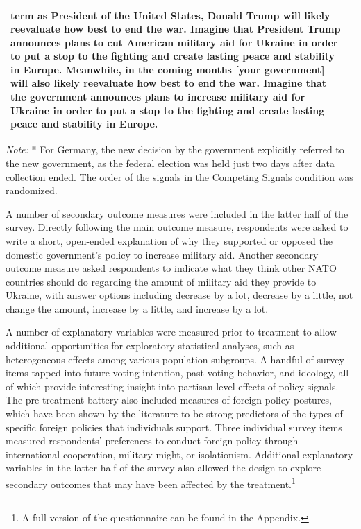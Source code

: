\begin{table}[H]
\begin{threeparttable}
\begin{tabular}{p{2.5cm}p{11.5cm}}
  term as President of the United States, Donald Trump will likely reevaluate how best to end the war. Imagine that President Trump announces plans to cut American military aid for Ukraine in order to put a
  stop to the fighting and create lasting peace and stability in Europe. Meanwhile, in the coming months [your government] will also likely reevaluate how best to end the war. Imagine that the government
  announces plans to increase military aid for Ukraine in order to put a stop to the fighting and create lasting peace and stability in Europe. \\
  \bottomrule
  \end{tabular}
  \begin{tablenotes}\small
  \item \textit{Note:} * For Germany, the new decision by the government explicitly referred to the new government, as the federal election was held just two days after data collection ended. The order of the
  signals in the Competing Signals condition was randomized.
  \end{tablenotes}
  \end{threeparttable}
  \end{table}

A number of secondary outcome measures were included in the latter half of the survey. Directly following the main outcome measure, respondents were asked to write a short, open-ended explanation of why they supported or opposed the domestic government's policy to increase military aid. Another secondary outcome measure asked respondents to indicate what they think other NATO countries should do regarding the amount of military aid they provide to Ukraine, with answer options including decrease by a lot, decrease by a little, not change the amount, increase by a little, and increase by a lot. 

A number of explanatory variables were measured prior to treatment to allow additional opportunities for exploratory statistical analyses, such as heterogeneous effects among various population subgroups. A handful of survey items tapped into future voting intention, past voting behavior, and ideology, all of which provide interesting insight into partisan-level effects of policy signals. The pre-treatment battery also included measures of foreign policy postures, which have been shown by the literature to be strong predictors of the types of specific foreign policies that individuals support. \autocite{wittkopf_foreign_1986, rathbun_taking_2016, gravelle_structure_2017,rathbun_dual_2020} Three individual survey items measured respondents' preferences to conduct foreign policy through international cooperation, military might, or isolationism. Additional explanatory variables in the latter half of the survey also allowed the design to explore secondary outcomes that may have been affected by the treatment.\footnote{A full version of the questionnaire can be found in the Appendix.}

